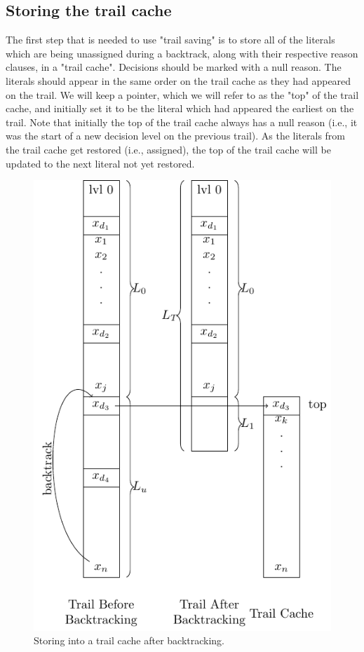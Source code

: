 \documentclass[runningheads]{llncs}
\begin{document}
\subsection{Storing the trail cache}

The first step that is needed to use "trail saving" is to store all of
the literals which are being unassigned during a backtrack, along with
their respective reason clauses, in a "trail cache". Decisions should
be marked with a null reason. The literals should appear in the same
order on the trail cache as they had appeared on the trail. We will
keep a pointer, which we will refer to as the "top" of the trail
cache, and initially set it to be the literal which had appeared the
earliest on the trail. Note that initially the top of the trail cache
always has a null reason (i.e., it was the start of a new decision
level on the previous trail). As the literals from the trail cache get
restored (i.e., assigned), the top of the trail cache will be updated
to the next literal not yet restored.

\begin{figure}\center\includegraphics[scale=0.7]{figures/trail_diagram.pdf}\caption{Storing into a trail cache after backtracking.}\end{figure}
\end{document}

